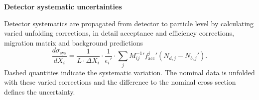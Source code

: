 \vspace{.5cm}
\noindent
\textbf{Detector systematic uncertainties}
\vspace{.5cm}

\noindent
Detector systematics are propagated from detector to particle level by calculating varied unfolding corrections, in detail acceptance and efficiency corrections, migration matrix and background predictions
\begin{equation}
    \frac{d\sigma_\text{sys}}{dX_i} = \frac{1}{L\cdot \Delta X_i} \cdot \frac{1}{\epsilon_i'} \cdot \sum_j {M_{ij}^{-1}}'
    {f_{\text{acc}}^{j}}'(N_{d,j}-N_{b,j}').
\end{equation}
Dashed quantities indicate the systematic variation.
The nominal data is unfolded with these varied corrections and the difference to the nominal cross section defines the uncertainty.

